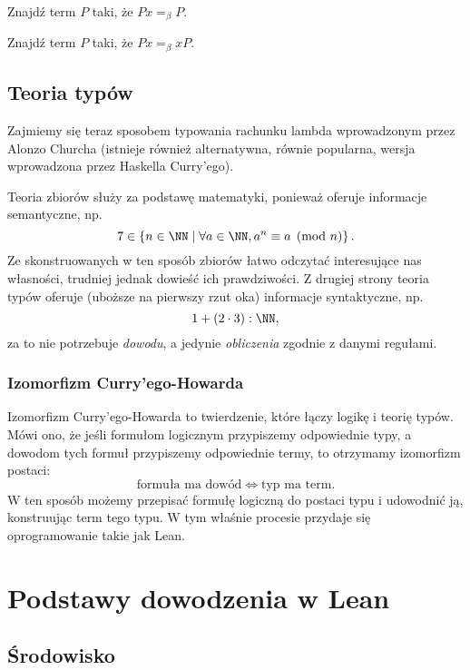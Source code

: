 \documentclass[polish,pretty]{angav}
\begin{document}
\begin{problem}
    Znajdź term $P$ taki, że $Px =_\beta P$.
\end{problem}

\begin{problem}
    Znajdź term $P$ taki, że $Px =_\beta xP$.
\end{problem}

\subsection{Teoria typów}

Zajmiemy się teraz sposobem typowania rachunku lambda wprowadzonym przez Alonzo Churcha (istnieje również alternatywna, równie popularna, wersja wprowadzona przez Haskella Curry'ego).



Teoria zbiorów służy za podstawę matematyki, ponieważ oferuje informacje semantyczne, np.
\[ 7 \in \left\{n \in \NN \mid \forall a \in \NN, a^n \equiv a \pmod{n} \right\}. \]
Ze skonstruowanych w ten sposób zbiorów łatwo odczytać interesujące nas własności, trudniej jednak dowieść ich prawdziwości.
Z drugiej strony teoria typów oferuje (uboższe na pierwszy rzut oka) informacje syntaktyczne, np.
\[ 1 + (2 \cdot 3) : \NN, \]
za to nie potrzebuje \emph{dowodu}, a jedynie \emph{obliczenia} zgodnie z danymi regułami.

\subsubsection*{Izomorfizm Curry'ego-Howarda}

Izomorfizm Curry'ego-Howarda to twierdzenie, które łączy logikę i teorię typów.
Mówi ono, że jeśli formułom logicznym przypiszemy odpowiednie typy, a dowodom tych formuł przypiszemy odpowiednie termy, to otrzymamy izomorfizm postaci:
\[ \text{formuła ma dowód} \iff \text{typ ma term}. \]
W ten sposób możemy przepisać formułę logiczną do postaci typu i udowodnić ją, konstruując term tego typu.
W tym właśnie procesie przydaje się oprogramowanie takie jak Lean.


\section{Podstawy dowodzenia w Lean}

\subsection{Środowisko}
\end{document}
